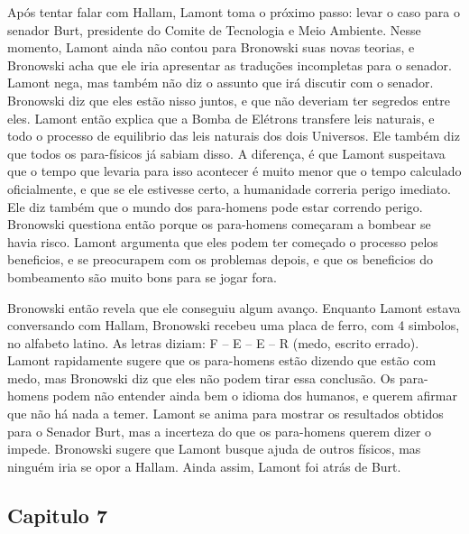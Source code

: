 \documentclass[14pt,portuguese]{extreport}
\begin{document}
	  Após tentar falar com Hallam, Lamont toma o próximo passo: levar o caso para o senador Burt, 
	  presidente do Comite de Tecnologia e Meio Ambiente. Nesse momento, Lamont ainda não contou 
	  para Bronowski suas novas teorias, e Bronowski acha que ele iria apresentar as traduções 
	  incompletas para o senador. Lamont nega, mas também não diz o assunto que irá discutir com 
	  o senador. Bronowski diz que eles estão nisso juntos, e que não deveriam ter segredos entre 
	  eles. Lamont então explica que a Bomba de Elétrons transfere leis naturais, e todo o processo 
	  de equilibrio das leis naturais dos dois Universos. Ele também diz que todos os para-físicos 
	  já sabiam disso. A diferença, é que Lamont suspeitava que o tempo que levaria para isso 
	  acontecer é muito menor que o tempo calculado oficialmente, e que se ele estivesse certo, a
	  humanidade correria perigo imediato. Ele diz também  que o mundo dos para-homens pode estar 
	  correndo perigo. Bronowski questiona então porque os para-homens começaram a bombear se havia 
	  risco. Lamont argumenta que eles podem ter começado o processo pelos beneficios, e se 
	  preocurapem com os problemas depois, e que os beneficios do bombeamento são muito bons para 
	  se jogar fora.
	
	  Bronowski então revela que ele conseguiu algum avanço. Enquanto Lamont estava conversando com 
	  Hallam, Bronowski recebeu uma placa de ferro, com 4 simbolos, no alfabeto latino. As letras 
	  diziam: F – E – E – R  (medo, escrito errado). Lamont rapidamente sugere que os para-homens 
	  estão dizendo que estão com medo, mas Bronowski diz que eles não podem tirar essa conclusão. 
	  Os para-homens podem não entender ainda bem o idioma dos humanos, e querem afirmar que não 
	  há nada a temer. Lamont se anima para mostrar os resultados obtidos para o Senador Burt, 
	  mas a incerteza do que os para-homens querem dizer o impede. Bronowski sugere que Lamont 
	  busque ajuda de outros físicos, mas ninguém iria se opor a Hallam. Ainda assim, Lamont foi 
	  atrás de Burt.

	\subsection{Capitulo 7}
\end{document}

